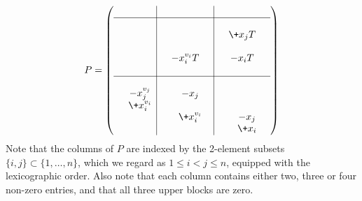 \documentclass[oneside, 12pt]{amsart}
\theoremstyle{definition}
\theoremstyle{remark}
\begin{document}
\begin{equation}
\label{presentation matrix}
P=
\left(
\begin{array}{c|c|c}
&&\\
\cline{1-3}
& 
\begin{matrix}
		\\
		\\
		\\
& -x_i^{v_i}T& \\	
		\\
\end{matrix}  
&
\begin{matrix}
  		\\
& \+x_jT&\\
		\\
& -x_iT& 	\\	
		\\
\end{matrix} 
			\\ 
			\cline{1-3} 
\begin{matrix}
\\
& -x_j^{v_j}\\
& \+x_i^{v_i}\\
		\\
		\\
\end{matrix} 		
& 
\begin{matrix}
\\
& -x_j 	\\
		\\
& \+x_i^{v_i}\\
		\\
\end{matrix} 
& 
\begin{matrix}
\\
		\\
		\\
& -x_j \\
& \+x_i \\
\end{matrix} 
			\\
\end{array}
\right)
\end{equation}
Note that the columns of $P$ are indexed by the 2-element subsets $\{i,j\}\subset\{1,\ldots,n\}$, 
which we regard as $1\leq i<j\leq n$, equipped with the lexicographic order.
Also note that each column  contains either two, three or four non-zero entries, 
and that all three upper blocks are zero. 
 
\end{document}
